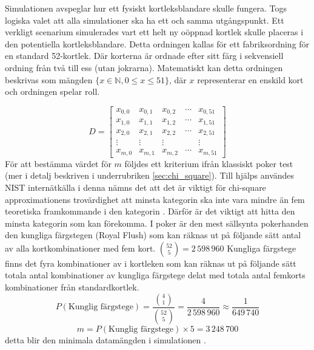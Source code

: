 \documentclass[swedish,a4paper]{article}
\begin{document}

Simulationen avspeglar hur ett fysiskt
kortleksblandare skulle fungera. Togs logiska valet att alla simulationer ska ha 
ett och samma utgångspunkt. Ett verkligt scenarium simulerades vart ett helt ny
oöppnad kortlek skulle placeras i den potentiella kortleksblandare. Detta
ordningen kallas för ett fabriksordning för en standard 52-kortlek. Där korterna
är ordnade efter sitt färg i sekvensiell ordning från två till ess (utan jokrarna).
Matematiskt kan detta ordningen beskrivas som mängden $\{x \in \mathbb{N},  0 \leq x \leq 51
\}$, där $x$ representerar en enskild kort och ordningen spelar roll. 



\begin{equation*}
	D = \begin{bmatrix}
		x_{0,0} & x_{0,1} & x_{0,2} & \cdots & x_{0,51}\\ 
		x_{1,0} & x_{1,1} & x_{1,2} & \cdots & x_{1,51}\\
		x_{2,0} & x_{2,1} & x_{2,2} & \cdots & x_{2,51}\\
		\vdots & \vdots & \vdots & \; & \vdots \\
		x_{m,0} & x_{m,1} & x_{m,2} & \cdots & x_{m,51}
	\end{bmatrix}
\end{equation*}
För att bestämma värdet för $m$ följdes ett kriterium ifrån klassiskt
poker test (mer i  detalj beskriven i underrubriken
\ref{sec:chi_square}).
Till hjälps användes NIST internätkälla   i
denna nämns det att det är viktigt för chi-square approximationens trovärdighet
att minsta kategorin ska inte vara mindre än fem teoretiska framkommande i den
kategorin \parencite{nist}. Därför är det
viktigt att hitta den minsta kategorin som kan förekomma. I poker är den mest
sällsynta pokerhanden den kungliga färgstegen (Royal Flush) som kan räknas ut på
följande sätt antal av alla kortkombinationer med fem kort. $\binom{52}{5} =
2\,598\,960$ Kungliga färgstege finns det fyra  kombinationer av i kortleken
som kan räknas ut på följande sätt totala antal kombinationer av kungliga
färgstege delat med totala antal femkorts kombinationer från standardkortlek.
$$ P(\text{Kunglig färgstege}) =  \frac{\binom{4}{1}}{\binom{52}{5}} =
\frac{4}{2\,598\,960} \approx \frac{1}{649\,740} $$ $$m = P(\text{Kunglig
färgstege})  \times 5 = 3\,248\,700$$ detta blir den minimala datamängden i simulationen
.
\end{document}
